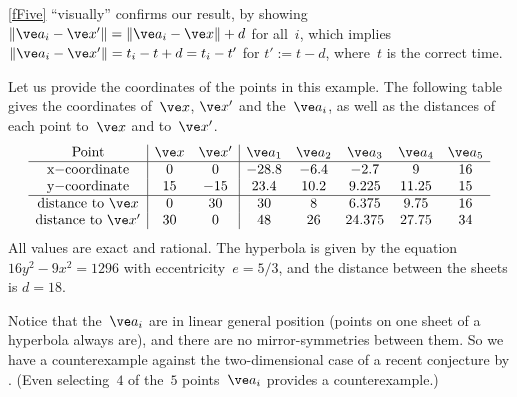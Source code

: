 \documentclass[reqno]{amsart}
\begin{document}
\begin{ex}
  \cref{fFive} ``visually'' confirms our result, by showing
  $\lVert\ve a_i - \ve x'\rVert = \lVert\ve a_i - \ve x\rVert + d$ for
  all~$i$, which implies
  $\lVert\ve a_i - \ve x'\rVert = t_i - t + d = t_i - t'$ for
  $t' := t - d$, where~$t$ is the correct time.

  Let us provide the coordinates of the points in this example. The
  following table gives the coordinates of~$\ve x$, $\ve x'$ and
  the~$\ve a_i$, as well as the distances of each point to~$\ve x$ and
  to~$\ve x'$.
  \[
    \begin{array}{c|cc|ccccc}
      \text{Point} & \ve x & \ve x' & \ve a_1 & \ve a_2 & \ve a_3 &
                                                                    \ve
                                                                    a_4
      & \ve a_5 \\ \hline
      $x$-\text{coordinate} & 0 & 0 & -28.8 & -6.4 & -2.7 & 9 & 16 \\
      $y$-\text{coordinate} & 15 & -15 & 23.4 & 10.2 & 9.225 &
                                                                11.25
      & 15 \\ \hline
      \text{distance to} \ \ve x & 0 & 30 & 30 & 8 & 6.375 & 9.75 &
                                                                    16
      \\
      \text{distance to} \ \ve x' & 30 & 0 & 48 & 26 & 24.375 &
                                                                27.75
      & 34
    \end{array} 
  \]
  All values are exact and rational. The hyperbola is given by the
  equation $16 y^2 - 9 x^2 = 1296$ with eccentricity~$e = 5/3$, and
  the distance between the sheets is $d = 18$.

  Notice that the~$\ve a_i$ are in linear general position (points on
  one sheet of a hyperbola always are), and there are no
  mirror-symmetries between them. So we have a counterexample against
  the two-dimensional case of a recent conjecture by
  . (Even selecting~$4$ of the~$5$
  points~$\ve a_i$ provides a counterexample.) 
\end{ex}
\end{document}
